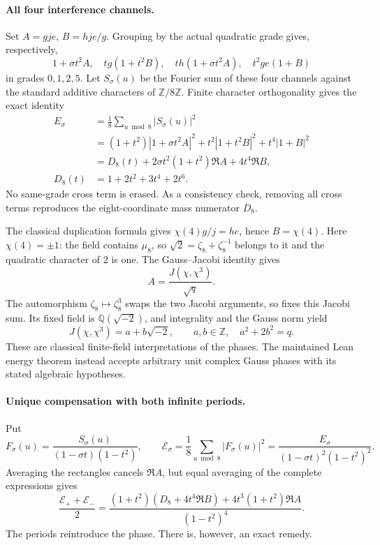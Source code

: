 \documentclass[11pt]{article}
\newcommand{\QQ}{\mathbb Q}
\newcommand{\ZZ}{\mathbb Z}
\begin{document}
\paragraph{All four interference channels.}
Set $A=gje$, $B=hje/g$.
Grouping by the actual quadratic grade gives, respectively,
\[
 1+\sigma t^2A,\quad
 tg(1+t^2B),\quad
 th(1+\sigma t^2A),\quad
 t^2ge(1+B)
\]
in grades $0,1,2,5$.
Let $S_\sigma(u)$ be the Fourier sum of these four channels against
the standard additive characters of $\ZZ/8\ZZ$.
Finite character orthogonality gives the exact identity
\[
\begin{split}
 E_\sigma&=\frac18\sum_{u\bmod8}|S_\sigma(u)|^2\\
 &=(1+t^2)|1+\sigma t^2A|^2
       +t^2|1+t^2B|^2+t^4|1+B|^2\\
 &=D_8(t)+2\sigma t^2(1+t^2)\Re A+4t^4\Re B,\\
 D_8(t)&=1+2t^2+3t^4+2t^6.
\end{split}
\]
No same-grade cross term is erased.
As a consistency check, removing all cross terms reproduces the
eight-coordinate mass numerator $D_8$.

The classical duplication formula gives
$\chi(4)g/j=he$, hence $B=\chi(4)$.
Here $\chi(4)=\pm1$: the field contains $\mu_8$, so
$\sqrt2=\zeta_8+\zeta_8^{-1}$ belongs to it and the quadratic character
of $2$ is one.
The Gauss--Jacobi identity gives
\[
 A=\frac{J(\chi,\chi^3)}{\sqrt q}.
\]
The automorphism $\zeta_8\mapsto\zeta_8^3$ swaps the two Jacobi
arguments, so fixes this Jacobi sum. Its fixed field is
$\QQ(\sqrt{-2})$, and integrality and the Gauss norm yield
\[
 J(\chi,\chi^3)=a+b\sqrt{-2},\qquad a,b\in\ZZ,\quad a^2+2b^2=q.
\]
These are classical finite-field interpretations of the phases.
The maintained Lean energy theorem instead accepts arbitrary unit
complex Gauss phases with its stated algebraic hypotheses.

\paragraph{Unique compensation with both infinite periods.}
Put
\[
 F_\sigma(u)=\frac{S_\sigma(u)}
 {(1-\sigma t)(1-t^2)},\qquad
 \mathcal E_\sigma=\frac18\sum_{u\bmod8}|F_\sigma(u)|^2
 =\frac{E_\sigma}{(1-\sigma t)^2(1-t^2)^2}.
\]
Averaging the rectangles cancels $\Re A$, but equal averaging of the
complete expressions gives
\[
 \frac{\mathcal E_++\mathcal E_-}{2}
 =\frac{(1+t^2)(D_8+4t^4\Re B)
          +4t^3(1+t^2)\Re A}{(1-t^2)^4}.
\]
The periods reintroduce the phase. There is, however, an exact remedy.
\end{document}
